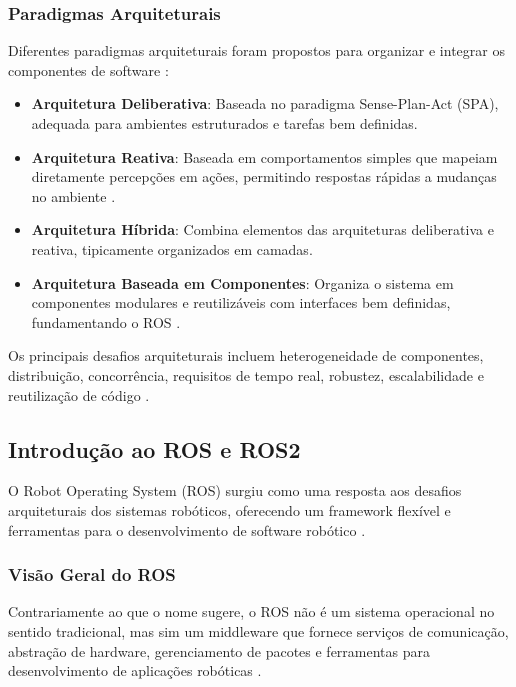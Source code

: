 \subsubsection{Paradigmas Arquiteturais}

Diferentes paradigmas arquiteturais foram propostos para organizar e integrar os componentes de software \cite{Kortenkamp2016, Brugali2007}:

\begin{itemize}
    \item \textbf{Arquitetura Deliberativa}: Baseada no paradigma Sense-Plan-Act (SPA), adequada para ambientes estruturados e tarefas bem definidas.
    
    \item \textbf{Arquitetura Reativa}: Baseada em comportamentos simples que mapeiam diretamente percepções em ações, permitindo respostas rápidas a mudanças no ambiente \cite{Brooks1986}.
    
    \item \textbf{Arquitetura Híbrida}: Combina elementos das arquiteturas deliberativa e reativa, tipicamente organizados em camadas.
    
    \item \textbf{Arquitetura Baseada em Componentes}: Organiza o sistema em componentes modulares e reutilizáveis com interfaces bem definidas, fundamentando o ROS \cite{Brugali2007}.
\end{itemize}

Os principais desafios arquiteturais incluem heterogeneidade de componentes, distribuição, concorrência, requisitos de tempo real, robustez, escalabilidade e reutilização de código \cite{Kortenkamp2016, Brugali2007}.

\subsection{Introdução ao ROS e ROS2}

O Robot Operating System (ROS) surgiu como uma resposta aos desafios arquiteturais dos sistemas robóticos, oferecendo um framework flexível e ferramentas para o desenvolvimento de software robótico \cite{Quigley2009}.

\subsubsection{Visão Geral do ROS}

Contrariamente ao que o nome sugere, o ROS não é um sistema operacional no sentido tradicional, mas sim um middleware que fornece serviços de comunicação, abstração de hardware, gerenciamento de pacotes e ferramentas para desenvolvimento de aplicações robóticas \cite{Quigley2009, Joseph2018}.

